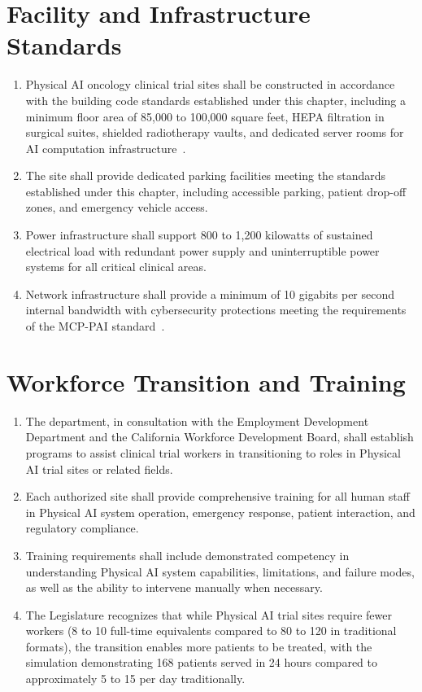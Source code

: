 \documentclass[11pt,letterpaper]{article}
\begin{document}
\section{Facility and Infrastructure Standards}

\begin{enumerate}[label=(\alph*)]
\item Physical AI oncology clinical trial sites shall be constructed in
  accordance with the building code standards established under this chapter,
  including a minimum floor area of 85,000 to 100,000 square feet, HEPA
  filtration in surgical suites, shielded radiotherapy vaults, and dedicated
  server rooms for AI computation infrastructure~\cite{sitespec2026}.

\item The site shall provide dedicated parking facilities meeting the standards
  established under this chapter, including accessible parking, patient
  drop-off zones, and emergency vehicle access.

\item Power infrastructure shall support 800 to 1,200 kilowatts of sustained
  electrical load with redundant power supply and uninterruptible power systems
  for all critical clinical areas.

\item Network infrastructure shall provide a minimum of 10 gigabits per second
  internal bandwidth with cybersecurity protections meeting the requirements of
  the MCP-PAI standard~\cite{sitespec2026}.
\end{enumerate}

\section{Workforce Transition and Training}

\begin{enumerate}[label=(\alph*)]
\item The department, in consultation with the Employment Development Department
  and the California Workforce Development Board, shall establish programs to
  assist clinical trial workers in transitioning to roles in Physical AI trial
  sites or related fields.

\item Each authorized site shall provide comprehensive training for all human
  staff in Physical AI system operation, emergency response, patient
  interaction, and regulatory compliance.

\item Training requirements shall include demonstrated competency in
  understanding Physical AI system capabilities, limitations, and failure modes,
  as well as the ability to intervene manually when necessary.

\item The Legislature recognizes that while Physical AI trial sites require
  fewer workers (8 to 10 full-time equivalents compared to 80 to 120 in
  traditional formats), the transition enables more patients to be treated,
  with the simulation demonstrating 168 patients served in 24 hours
  compared to approximately 5 to 15 per day traditionally.
\end{enumerate}
\end{document}
